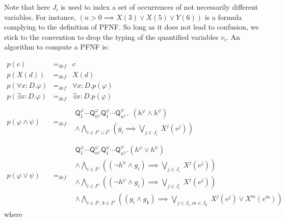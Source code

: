 \documentclass{article}
\begin{document}
Note that here $J_{i}$ is used to index a set of occurrences of not
necessarily different variables. For instance, $(n>0\implies X(3)\vee
X(5)\vee Y(6))$ is a formula complying to the definition of PFNF. So long as
it does not lead to confusion, we stick to the convention to drop the typing
of the quantified variables $v_{i}$. An algorithm to compute a PFNF is:

\begin{equation*}
\begin{array}{lll}
p(c) & =_{def} & c \\
p(X(d)) & =_{def} & X(d) \\
p(\forall {x{:}D}.\varphi ) & =_{def} & \forall {x{:}D}.p(\varphi ) \\
p(\exists {x{:}D}.\varphi ) & =_{def} & \exists {x{:}D}.p(\varphi ) \\
&  &  \\
p(\varphi \wedge \psi ) & =_{def} &
\begin{array}{l}
\mathsf{Q}_{1}^{\varphi }\cdots \mathsf{Q}_{n^{\varphi }}^{\varphi }\mathsf{Q%
}_{1}^{\psi }\cdots \mathsf{Q}_{n^{\psi }}^{\psi }.~~\left( h^{\varphi
}\wedge h^{\psi }\right)  \\
\wedge \bigwedge\limits_{i\in I^{\varphi }\cup I^{\psi }}\left(
g_{i}\implies \bigvee\limits_{j\in J_{i}}~X^{j}(e^{j})\right)
\end{array}
\\
&  &  \\
p(\varphi \vee \psi ) & =_{def} &
\begin{array}{l}
\mathsf{Q}_{1}^{\varphi }\cdots \mathsf{Q}_{n^{\varphi }}^{\varphi }\mathsf{Q%
}_{1}^{\psi }\cdots \mathsf{Q}_{n^{\psi }}^{\psi }.\left( h^{\varphi }\vee
h^{\psi }\right)  \\
\wedge \bigwedge\limits_{i\in I^{\varphi }}\left( \left( \lnot h^{\psi
}\wedge g_{i}\right) \implies \bigvee\limits_{j\in
J_{i}}~X^{j}(e^{j})\right)  \\
\wedge \bigwedge\limits_{i\in I^{\psi }}\left( \left( \lnot h^{\varphi
}\wedge g_{i}\right) \implies \bigvee\limits_{j\in
J_{i}}~X^{j}(e^{j})\right)  \\
\wedge \bigwedge\limits_{i\in I^{\varphi },k\in I^{\psi }}\left( \left(
g_{i}\wedge g_{k}\right) \implies \bigvee\limits_{j\in J_{i},m\in
J_{k}}~X^{j}(e^{j})\vee X^{m}(e^{m})\right)
\end{array}%
\end{array}%
\end{equation*}%
where
\end{document}
